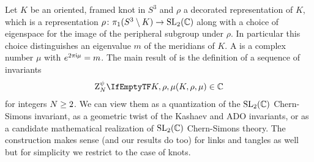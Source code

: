\documentclass[margincite, leqno]{sl2art}
\numberwithin{equation}{section}
\begin{document}
Let \(K\) be an oriented, framed knot in \(S^{3}\) and \(\rho\)  a
decorated representation of \(K\), which is a representation \(\rho \colon
\pi_{1}(S^3 \setminus K) \to \operatorname{SL}_2(\mathbb{C})\) along with a choice of eigenspace for
the image of the peripheral subgroup under \(\rho\).
In particular this choice distinguishes an eigenvalue \(m\) of the
meridians of \(K\).
A  is a complex number \(\mu\) with \(e^{2 \pi \mathsf{i} \mu} = m\).
The main result of \cite{McPhailSnyderVolume} is the definition of a
sequence of invariants%
\[
  \qinv{K, \rho, \mu} \in \mathbb{C}
\]
for integers  \(N \ge 2\).
We can view them as a quantization of the  \(\operatorname{SL}_2(\mathbb{C})\) Chern-Simons
invariant, as a geometric twist of the Kashaev \cite{Kashaev1995} and
ADO \cite{Akutsu1992} invariants, or as a candidate mathematical
realization of \(\operatorname{SL}_2(\mathbb{C})\) Chern-Simons theory.
The construction makes sense (and our results do too) for links and
tangles as well but for simplicity we restrict to the case of knots.
\end{document}

